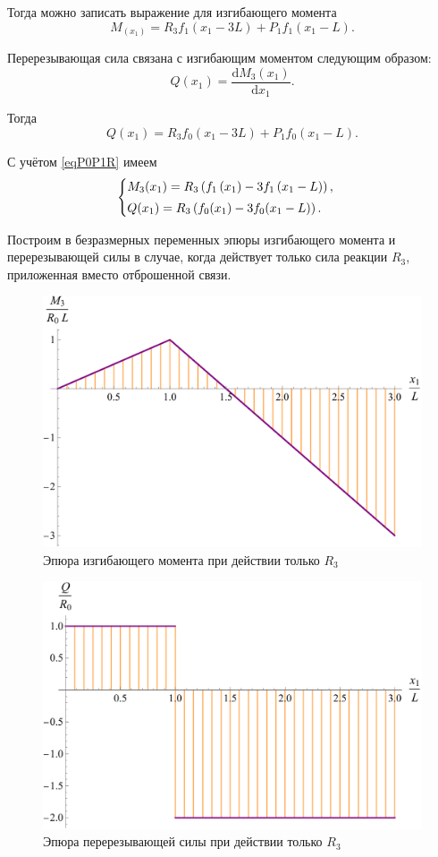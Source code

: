 \documentclass[12pt, a4paper]{article}
\begin{document}
	Тогда можно записать выражение для изгибающего момента
	\[
	M_(x_1) = R_3 f_1(x_1 - 3L) + P_1 f_1(x_1 - L).
	\]
	
	Перерезывающая сила связана с изгибающим моментом следующим образом:
	\begin{equation}
		Q(x_1) = \dfrac{\mathrm{d} M_3(x_1)}{\mathrm{d} x_1}.
		\label{eqQ}
	\end{equation}
	
	Тогда
	\[
	Q(x_1) = R_3 f_0(x_1 - 3L) + P_1 f_0(x_1 - L).
	\]
	
	С учётом \eqref{eqP0P1R} имеем
	\begin{equation}
		\begin{cases} \vspace{0.25em}
			M_3(x_1) = R_3 \left( f_1\left(x_1\right) - 3 f_1\left(x_1 - L\right) \right), \\
			Q(x_1) = R_3 \left( f_0(x_1) - 3 f_0(x_1 - L) \right). \\
		\end{cases}
		\label{eqM3QR}
	\end{equation}
	
	Построим в безразмерных переменных эпюры изгибающего момента и перерезывающей силы в случае, когда действует только сила реакции $R_3$, приложенная вместо отброшенной связи.
	
	\begin{figure}[!h]
		\centering
		\includegraphics[width=0.75\linewidth]{plot-5}
		\caption{Эпюра изгибающего момента при действии только $R_3$}
	\end{figure} 
	
	\newpage
	
	\begin{figure}[!h]
		\centering
		\includegraphics[width=0.75\linewidth]{plot-6}
		\caption{Эпюра перерезывающей силы при действии только $R_3$}
	\end{figure}
	
\end{document}
